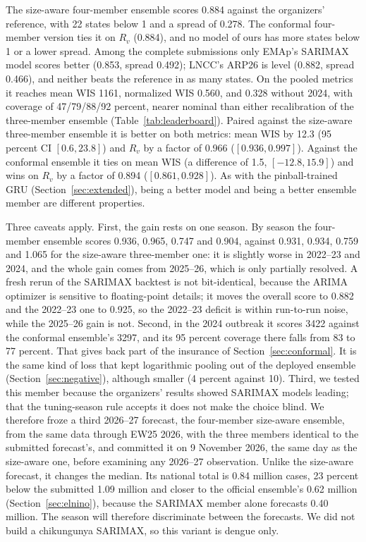 \documentclass[11pt]{article}
\begin{document}
The size-aware four-member ensemble scores 0.884 against the organizers' reference, with 22 states
below 1 and a spread of 0.278. The conformal four-member version ties it on $R_v$ (0.884), and no
model of ours has more states below 1 or a lower spread. Among the complete
submissions only EMAp's SARIMAX model scores better (0.853, spread 0.492); LNCC's ARP26 is level
(0.882, spread 0.466), and neither beats the reference in as many states. On the pooled metrics it
reaches mean WIS 1161, normalized WIS 0.560, and 0.328 without 2024, with coverage of
47/79/88/92 percent, nearer nominal than either recalibration of the three-member ensemble
(Table~\ref{tab:leaderboard}). Paired against the size-aware three-member ensemble it is better on
both metrics: mean WIS by 12.3 (95 percent CI $[0.6, 23.8]$) and $R_v$ by a factor of 0.966
($[0.936, 0.997]$). Against the conformal ensemble it ties on mean WIS (a difference of 1.5,
$[-12.8, 15.9]$) and wins on $R_v$ by a factor of 0.894 ($[0.861, 0.928]$). As with the
pinball-trained GRU (Section~\ref{sec:extended}), being a better model and being a better ensemble
member are different properties.

Three caveats apply. First, the gain rests on one season. By season the four-member ensemble scores
0.936, 0.965, 0.747 and 0.904, against 0.931, 0.934, 0.759 and 1.065 for the size-aware
three-member one: it is slightly worse in 2022--23 and 2024, and the whole gain comes from
2025--26, which is only partially resolved. A fresh rerun of the SARIMAX backtest is not
bit-identical, because the ARIMA optimizer is sensitive to floating-point details; it moves the
overall score to 0.882 and the 2022--23 one to 0.925, so the 2022--23 deficit is within run-to-run
noise, while the 2025--26 gain is not. Second, in the 2024 outbreak it scores 3422 against the
conformal ensemble's 3297, and its 95 percent coverage there falls from 83 to 77 percent. That gives
back part of the insurance of Section~\ref{sec:conformal}. It is the same kind of loss that kept
logarithmic pooling out of the deployed ensemble (Section~\ref{sec:negative}), although smaller
(4 percent against 10). Third, we tested this member because the organizers' results showed
SARIMAX models leading; that the tuning-season rule accepts it does not make the choice blind.
We therefore froze a third 2026--27 forecast, the four-member size-aware ensemble, from the same
data through EW25 2026, with the three members identical to the submitted forecast's, and
committed it on 9 November 2026, the same day as the size-aware one, before examining any 2026--27
observation. Unlike the size-aware forecast, it changes the median. Its national total is
0.84 million cases, 23 percent below the submitted 1.09 million and closer to the official
ensemble's 0.62 million (Section~\ref{sec:elnino}), because the SARIMAX member alone forecasts
0.40 million. The season will therefore discriminate between the forecasts. We did not build a
chikungunya SARIMAX, so this variant is dengue only.
\end{document}
